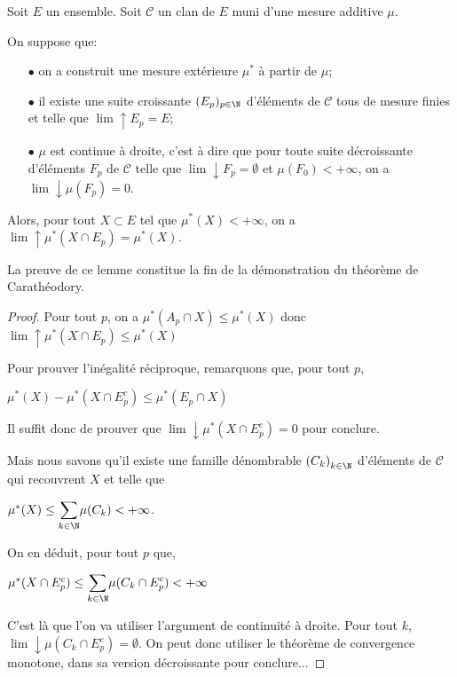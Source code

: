 \begin{lem}
Soit $E$ un ensemble. Soit $\mathcal{C}$ un clan de $E$ muni d'une mesure additive $\mu$.

On suppose que:
\begin{itemize}
\item[$\bullet$] on a construit une mesure extérieure $\mu^{*}$ à partir de $\mu$;
\item[$\bullet$] il existe une suite croissante $(E_p)_{p \in \N}$ d'éléments de $\mathcal{C}$ tous de mesure finies et telle que $\lim \uparrow E_p = E$;
\item[$\bullet$] $\mu$ est continue à droite, c'est à dire que pour toute suite décroissante d'éléments $F_p$ de $\mathcal{C}$ telle que $\lim \downarrow F_p =  \emptyset$ et $\mu(F_0) < +\infty$, on a $\lim \downarrow \mu(F_p)=0$.
\end{itemize}

Alors, pour tout $X \subset E$ tel que $\mu^{*}(X)<+\infty$, on a $\lim \uparrow \mu^{*}(X \cap E_p) = \mu^{*}(X)$.
\end{lem}

La preuve de ce lemme constitue la fin de la démonstration du théorème de Carathéodory.

\begin{proof}
Pour tout $p$, on a $\mu^{*}(A_p \cap X) \leq \mu^{*}(X)$ donc $\lim \uparrow \mu^{*}(X \cap E_p) \leq \mu^{*}(X)$


Pour prouver l'inégalité réciproque, remarquons que, pour tout $p$,

$
\mu^{*}(X) - \mu^{*}(X \cap E_p^c) \leq \mu^{*}(E_p \cap X)
$

Il suffit donc de prouver que $\lim \downarrow \mu^{*}(X \cap E_p^c) = 0$ pour conclure.

Mais nous savons qu'il existe une famille dénombrable $\left(C_k\right)_{k \in \N}$ d'éléments de $\mathcal{C}$ qui recouvrent $X$ et telle que 

$\mu^{*}(X) \leq \displaystyle{\sum \limits_{k \in \N}} \mu(C_k) < +\infty$.

On en déduit, pour tout $p$ que,

$\mu^{*}(X \cap E_p^c) \leq \displaystyle{\sum \limits_{k \in \N}} \mu(C_k \cap E_p^c) < +\infty
$

C'est là que l'on va utiliser l'argument de continuité à droite. Pour tout $k$, $\lim \downarrow \mu(C_k \cap E_p^c) = \emptyset$. On peut donc utiliser le théorème de convergence monotone, dans sa version décroissante pour conclure...
\end{proof}

